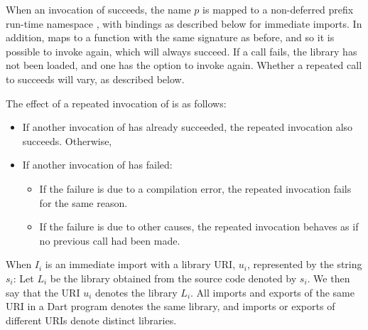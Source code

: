\documentclass[makeidx]{article}
\begin{document}
{\LMHash{}%
When an invocation of  succeeds,
the name $p$ is mapped to a non-deferred prefix run-time namespace
,
with bindings as described below for immediate imports.
In addition, 
maps  to a function with the same signature as before,
and so it is possible to invoke  again,
which will always succeed.
If a call fails, the library has not been loaded,
and one has the option to invoke  again.
Whether a repeated call to  succeeds will vary,
as described below.


\LMHash{}%
The effect of a repeated invocation of  is as follows:

\begin{itemize}
\item
  If another invocation of  has already succeeded,
  the repeated invocation also succeeds.
  Otherwise,
\item
  If another invocation of  has failed:

  \begin{itemize}
  \item
    If the failure is due to a compilation error,
    the repeated invocation fails for the same reason.
  \item
    If the failure is due to other causes,
    the repeated invocation behaves as if no previous call had been made.
  \end{itemize}
\end{itemize}

\EndCase

\LMHash{}%
When $I_i$ is an immediate import with a library URI, $u_i$,
represented by the string $s_i$:
Let $L_i$ be the library obtained from the source code denoted by $s_i$.
We then say that the URI $u_i$ denotes the library $L_i$.
All imports and exports of the same URI in a Dart program denotes
the same library,
and imports or exports of different URIs denote distinct libraries.

}
\end{document}
